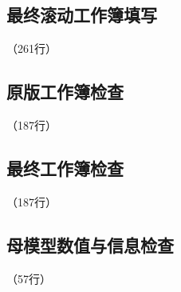 
\label{code:source:23:end}


\subsection{最终滚动工作簿填写}

\label{code:source:24}

{\small\noindent{}\quad（261行）\par}


\label{code:source:24:end}


\subsection{原版工作簿检查}

\label{code:source:25}

{\small\noindent{}\quad（187行）\par}


\label{code:source:25:end}


\subsection{最终工作簿检查}

\label{code:source:26}

{\small\noindent{}\quad（187行）\par}


\label{code:source:26:end}


\subsection{母模型数值与信息检查}

\label{code:source:27}

{\small\noindent{}\quad（57行）\par}

